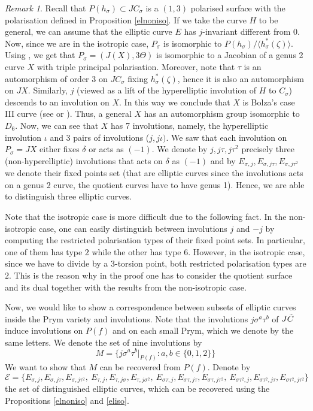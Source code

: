 \documentclass{amsart}
\theoremstyle{remark}
\newtheorem{rem}[thm]{Remark}
\numberwithin{equation}{section}
\newcommand{\tC}{\Tilde{C}}
\newcommand{\cE}{\mathcal{E}}
\newcommand{\s}{\sigma}
\newcommand{\st}{\sigma\tau}
\begin{document}
\begin{rem}
Recall that $P(h_{\sigma})\subset JC_\s$ is a $(1,3)$ polarised surface with the polarisation defined in Proposition \ref{elnoniso}. If we take the curve $H$ to be general, we can assume that the elliptic curve $E$ has $j$-invariant different from $0$. Now, since we are in the isotropic case,  $P_\s$ is isomorphic to $P(h_{\sigma})/\langle h_\s^*(\zeta) \rangle$. Using \cite[Prop 3.6]{BLExE}, we get that $P_\s=(J(X),3\Theta)$ is isomorphic to a Jacobian of a genus 2 curve $X$ with triple principal polarisation. Moreover, note that $\tau$ is an automorphism of order $3$ on $JC_\s$ fixing $h_\s^*(\zeta)$, hence it is also an automorphism on $JX$. Similarly, $j$ (viewed as a lift of the hyperelliptic involution of $H$ to $C_\s$) descends to an involution on $X$. In this way we conclude that $X$ is Bolza's case III curve (see \cite[p.340]{BL} or \cite{Bolza}).  
Thus, a general $X$ has an automorphism group isomorphic to $D_6$. Now, we can see that $X$ has 7 involutions, namely, the hyperelliptic involution $\iota$ and 3 pairs of involutions ($j,j\iota)$. We saw that each involution on $P_\s = JX$ either fixes $\delta$ or acts as $(-1)$. We denote by $j, j\tau, j\tau^2$ precisely three (non-hyperelliptic) involutions that acts on $\delta$ as $(-1)$ and by $E_{\sigma,j}, E_{\sigma,j\tau}, E_{\sigma,j\tau^2}$ we denote their fixed points set (that are elliptic curves since the involutions acts on a genus 2 curve, the quotient curves have to have genus 1).  Hence, we are able to distinguish three elliptic curves.

Note that the isotropic case is more difficult due to the following fact. In the non-isotropic case, one can easily distinguish between involutions $j$ and $-j$ by computing the restricted polarisation types of their fixed point sets. In particular, one of them has type $2$ while the other has type $6$. However, in the isotropic case, since we have to divide by a 3-torsion point, both restricted polarisation types are $2$. This is the reason why in the proof one has to consider the quotient surface and its dual together with the results from the non-isotropic case.
\end{rem}


\vspace{3mm}

Now, we would like to show a correspondence between subsets of elliptic curves inside the Prym variety and involutions.
Note that the involutions $j\sigma^a\tau^b$ of $J\tC$ induce involutions on $P(f)$ and on each small Prym, which we denote by the same letters. We denote the set of nine involutions by 
$$M=\{j\sigma^a\tau^b|_{P(f)}: a,b\in\{0,1,2\}\}$$
We want to show that $M$ can be recovered from $P(f)$. 
Denote by $$\cE=\{E_{\sigma,j}, E_{\sigma,j\tau}, E_{\sigma,j\tau^2},\ E_{\tau,j}, E_{\tau,j\s}, E_{\tau,j\s^2}, \ E_{\st,j}, E_{\st,j\tau}, E_{\st,j\tau^2}, \ E_{\st^2,j}, E_{\st^2,j\tau}, E_{\st^2,j\tau^2}\}$$
the set of distinguished elliptic curves, which can be recovered using the Propositions \ref{elnoniso} and \ref{eliso}.
\end{document}
